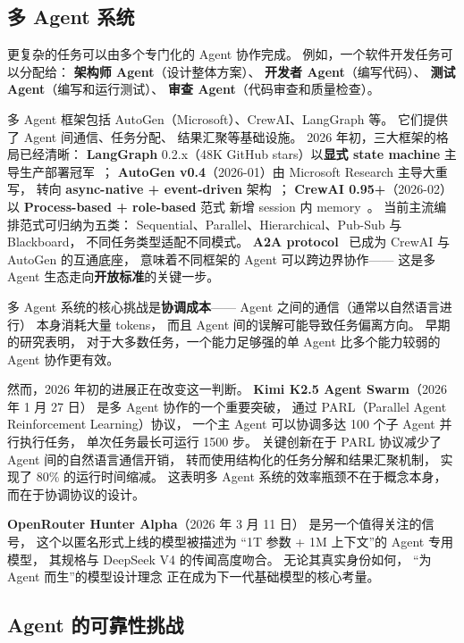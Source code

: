 \subsection{多 Agent 系统}

更复杂的任务可以由多个专门化的 Agent 协作完成。
例如，一个软件开发任务可以分配给：
\textbf{架构师 Agent}（设计整体方案）、
\textbf{开发者 Agent}（编写代码）、
\textbf{测试 Agent}（编写和运行测试）、
\textbf{审查 Agent}（代码审查和质量检查）。

多 Agent 框架包括
AutoGen（Microsoft）、CrewAI、LangGraph 等。
它们提供了 Agent 间通信、任务分配、
结果汇聚等基础设施。
2026 年初，三大框架的格局已经清晰：
\textbf{LangGraph} 0.2.x（48K GitHub stars）以\textbf{显式 state machine}
主导生产部署冠军~\cite{langgraph_orchestration_2026}；
\textbf{AutoGen v0.4}（2026-01）由 Microsoft Research 主导大重写，
转向 \textbf{async-native + event-driven} 架构~\cite{autogen_v04_2026}；
\textbf{CrewAI 0.95+}（2026-02）以
\textbf{Process-based + role-based} 范式
新增 session 内 memory~\cite{crewai_095_2026}。
当前主流编排范式可归纳为五类：
Sequential、Parallel、Hierarchical、Pub-Sub 与 Blackboard，
不同任务类型适配不同模式。
\textbf{A2A protocol}~\cite{a2a_protocol_2026}
已成为 CrewAI 与 AutoGen 的互通底座，
意味着不同框架的 Agent 可以跨边界协作——
这是多 Agent 生态走向\textbf{开放标准}的关键一步。

多 Agent 系统的核心挑战是\textbf{协调成本}——
Agent 之间的通信（通常以自然语言进行）
本身消耗大量 tokens，
而且 Agent 间的误解可能导致任务偏离方向。
早期的研究表明，
对于大多数任务，一个能力足够强的单 Agent
比多个能力较弱的 Agent 协作更有效。

然而，2026 年初的进展正在改变这一判断。
\textbf{Kimi K2.5 Agent Swarm}（2026 年 1 月 27 日）
是多 Agent 协作的一个重要突破，
通过 PARL（Parallel Agent Reinforcement Learning）协议，
一个主 Agent 可以协调多达 100 个子 Agent 并行执行任务，
单次任务最长可运行 1500 步。
关键创新在于 PARL 协议减少了 Agent 间的自然语言通信开销，
转而使用结构化的任务分解和结果汇聚机制，
实现了 80\% 的运行时间缩减。
这表明多 Agent 系统的效率瓶颈不在于概念本身，
而在于协调协议的设计。

\textbf{OpenRouter Hunter Alpha}（2026 年 3 月 11 日）
是另一个值得关注的信号，
这个以匿名形式上线的模型被描述为
“1T 参数 + 1M 上下文”的 Agent 专用模型，
其规格与 DeepSeek V4 的传闻高度吻合。
无论其真实身份如何，
“为 Agent 而生”的模型设计理念
正在成为下一代基础模型的核心考量。

\subsection{Agent 的可靠性挑战}

